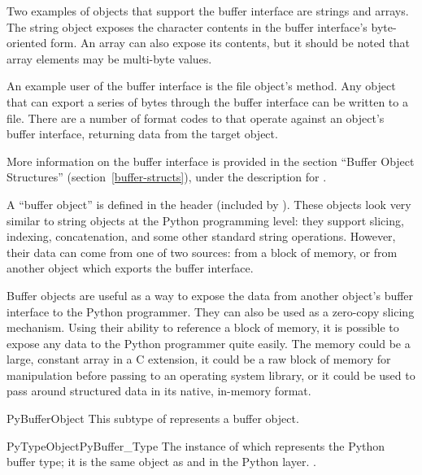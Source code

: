 Two examples of objects that support
the buffer interface are strings and arrays. The string object exposes
the character contents in the buffer interface's byte-oriented
form. An array can also expose its contents, but it should be noted
that array elements may be multi-byte values.

An example user of the buffer interface is the file object's
 method. Any object that can export a series of bytes
through the buffer interface can be written to a file. There are a
number of format codes to  that operate
against an object's buffer interface, returning data from the target
object.

More information on the buffer interface is provided in the section
``Buffer Object Structures'' (section~\ref{buffer-structs}), under
the description for .

A ``buffer object'' is defined in the  header
(included by ). These objects look very similar to
string objects at the Python programming level: they support slicing,
indexing, concatenation, and some other standard string
operations. However, their data can come from one of two sources: from
a block of memory, or from another object which exports the buffer
interface.

Buffer objects are useful as a way to expose the data from another
object's buffer interface to the Python programmer. They can also be
used as a zero-copy slicing mechanism. Using their ability to
reference a block of memory, it is possible to expose any data to the
Python programmer quite easily. The memory could be a large, constant
array in a C extension, it could be a raw block of memory for
manipulation before passing to an operating system library, or it
could be used to pass around structured data in its native, in-memory
format.

\begin{ctypedesc}{PyBufferObject}
  This subtype of  represents a buffer object.
\end{ctypedesc}

\begin{cvardesc}{PyTypeObject}{PyBuffer_Type}
  The instance of  which represents the Python
  buffer type; it is the same object as  and 
   in the Python layer.
  .
\end{cvardesc}

